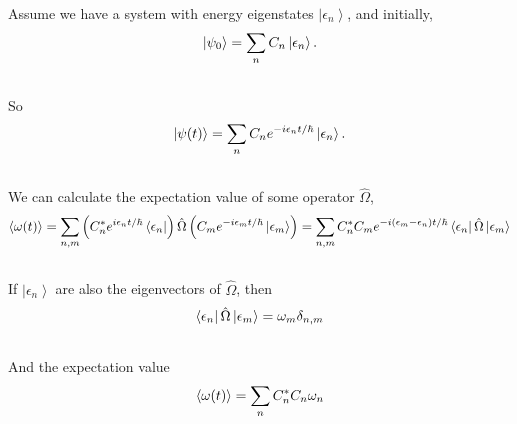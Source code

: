 \documentclass[letterpaper,10pt,english]{sphinxmanual}
\newcommand{\bra}[1]{\left\langle #1\right|}
\newcommand{\ket}[1]{\left| #1\right\rangle}
\begin{document}
Assume we have a system with energy eigenstates $\ket{\epsilon _ n}$, and initially,
\begin{gather}
\begin{split}\ket{\psi _ 0} = \sum_n C _ n \ket{\epsilon _ n} .\end{split}\notag\\\begin{split}\end{split}\notag
\end{gather}
So
\begin{gather}
\begin{split}\ket{\psi(t)} = \sum _ n C _ n e^{-i\epsilon _ n t/\hbar} \ket{\epsilon _ n} .\end{split}\notag\\\begin{split}\end{split}\notag
\end{gather}
We can calculate the expectation value of some operator $\hat \Omega$,
\begin{gather}
\begin{split}\left< \omega (t) \right> =  \sum _ {n,m} \left( C _ n^ * e^{i\epsilon _ n t/\hbar } \bra{\epsilon _ n} \right)  \hat \Omega \left( C _ m e^{-i \epsilon _ m t/\hbar} \ket{\epsilon _ m} \right) = \sum _ {n,m} C _ n ^* C _ m e^{-i(\epsilon _ m - \epsilon _ n) t/\hbar} \bra{\epsilon _ n} \hat \Omega \ket{\epsilon _ m}\end{split}\notag\\\begin{split}\end{split}\notag
\end{gather}
If $\ket{\epsilon _ n}$ are also the eigenvectors of $\hat \Omega$, then
\begin{gather}
\begin{split}\bra{\epsilon _ n} \hat \Omega \ket{\epsilon _ m} = \omega _ m \delta _ {n,m}\end{split}\notag\\\begin{split}\end{split}\notag
\end{gather}
And the expectation value
\begin{gather}
\begin{split}\left<  \omega (t) \right> = \sum _ {n} C _ n^* C _ n \omega _ n\end{split}\notag\\\begin{split}\end{split}\notag
\end{gather}
\end{document}
